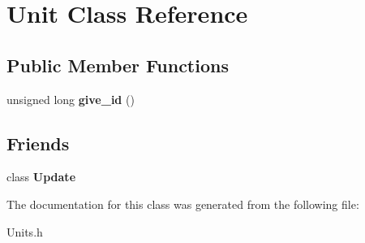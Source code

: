 \hypertarget{class_unit}{\section{Unit Class Reference}
\label{class_unit}
}
\subsection*{Public Member Functions}
\begin{DoxyCompactItemize}
\item 
\hypertarget{class_unit_ade0a34dce0fd220c0065959390de834b}{unsigned long {\bfseries give\-\_\-id} ()}\label{class_unit_ade0a34dce0fd220c0065959390de834b}

\end{DoxyCompactItemize}
\subsection*{Friends}
\begin{DoxyCompactItemize}
\item 
\hypertarget{class_unit_a2cedee6ab0da841755431efd84ad466b}{class {\bfseries Update}}\label{class_unit_a2cedee6ab0da841755431efd84ad466b}

\end{DoxyCompactItemize}


The documentation for this class was generated from the following file\-:\begin{DoxyCompactItemize}
\item 
Units.\-h\end{DoxyCompactItemize}
